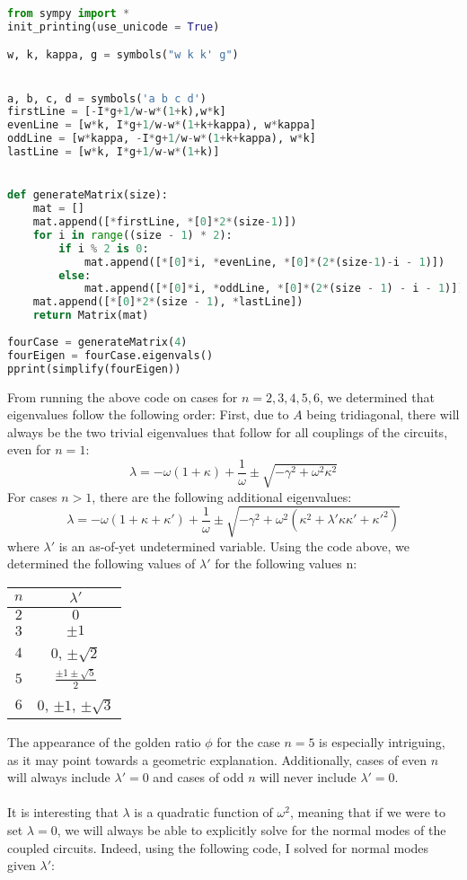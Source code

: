 \documentclass[11pt]{article}
\begin{document}
\begin{lstlisting}[language=Python]
from sympy import *
init_printing(use_unicode = True)

w, k, kappa, g = symbols("w k k' g")


a, b, c, d = symbols('a b c d')
firstLine = [-I*g+1/w-w*(1+k),w*k]
evenLine = [w*k, I*g+1/w-w*(1+k+kappa), w*kappa]
oddLine = [w*kappa, -I*g+1/w-w*(1+k+kappa), w*k]
lastLine = [w*k, I*g+1/w-w*(1+k)]


def generateMatrix(size):
    mat = []
    mat.append([*firstLine, *[0]*2*(size-1)])
    for i in range((size - 1) * 2):
        if i % 2 is 0:
            mat.append([*[0]*i, *evenLine, *[0]*(2*(size-1)-i - 1)])
        else:
            mat.append([*[0]*i, *oddLine, *[0]*(2*(size - 1) - i - 1)])
    mat.append([*[0]*2*(size - 1), *lastLine])
    return Matrix(mat)
 
fourCase = generateMatrix(4)
fourEigen = fourCase.eigenvals()
pprint(simplify(fourEigen))
\end{lstlisting}

From running the above code on cases for $n=2,3,4,5,6$, we determined that eigenvalues follow the following order:
First, due to $A$ being tridiagonal, there will always be the two trivial eigenvalues that follow for all couplings of the circuits, even for $n=1$:
\[
\lambda = -\omega (1+\kappa) + \frac{1}{\omega} \pm \sqrt{-\gamma^2 +\omega^2 \kappa^2}
\]
For cases $n > 1$, there are the following additional eigenvalues:
\[
\lambda = -\omega (1+\kappa + \kappa') + \frac{1}{\omega} \pm \sqrt{-\gamma^2 + \omega^2 (\kappa^2 + \lambda' \kappa \kappa' + \kappa'^2)}
\]
where $\lambda'$ is an as-of-yet undetermined variable. Using the code above, we determined the following values of $\lambda'$ for the following values n:
\begin{center}
	\begin{tabular}{ c | c}
		$n$ & $\lambda'$ \\
		\hline
		$2$ & $0$ \\
		$3$ & $\pm 1$\\
		$4$ & $0$, $\pm \sqrt{2}$\\
		$5$ & $\frac{\pm 1 \pm \sqrt{5}}{2}$\\
		$6$ & $0$, $\pm 1$, $\pm \sqrt{3}$
	\end{tabular}
\end{center}

The appearance of the golden ratio $\phi$ for the case $n=5$ is especially intriguing, as it may point towards a geometric explanation. Additionally, cases of even $n$ will always include $\lambda' = 0$ and cases of odd $n$ will never include $\lambda' = 0$.
\\
\\
It is interesting that $\lambda$ is a quadratic function of $\omega^2$, meaning that if we were to set $\lambda = 0$, we will always be able to explicitly solve for the normal modes of the coupled circuits. Indeed, using the following code, I solved for normal modes given $\lambda'$:
\end{document}
